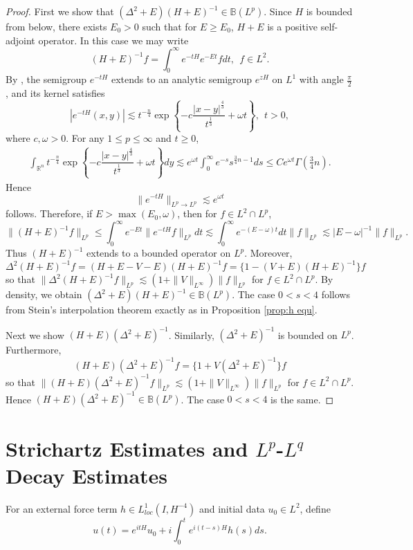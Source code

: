 \documentclass[11pt,a4paper]{article}
\numberwithin{equation}{section}
\begin{document}
\begin{proof}
First we show that $(\Delta^{2} + E)(H + E)^{-1} \in \mathbb{B}(L^{p})$. Since $H$ is bounded from below, there exists $E_{0} > 0$ such that for $E \geq E_{0}$, $H + E$ is a positive self-adjoint operator. In this case we may write
\[ (H + E)^{-1}f = \int_{0}^{\infty} e^{-tH}e^{-Et}fdt,\ \ f \in L^{2}. \]
By \cite{Deng-1}, the semigroup $e^{-tH}$ extends to an analytic semigroup $e^{zH}$ on $L^{1}$ with angle $\frac{\pi}{2}$, and its kernel satisfies
\begin{equation}
|e^{-tH}(x, y)| \lesssim t^{-\frac{n}{4}} \exp \left \{ -c\dfrac{|x - y|^{\frac{4}{3}}}{t^{\frac{1}{3}}} + \omega t \right\},\ \ t > 0,
\end{equation}
where $c, \omega > 0$. For any $1 \leq p \leq \infty$ and $t \geq 0$,
\begin{align*}
\int_{\mathbb{R}^{n}} t^{-\frac{n}{4}} \exp \left \{ -c\dfrac{|x - y|^{\frac{4}{3}}}{t^{\frac{1}{3}}} + \omega t \right\} dy \lesssim e^{\omega t}\int_{0}^{\infty} e^{-s}s^{\frac{3}{4}n - 1} ds \leq Ce^{\omega t}\Gamma\left(\frac{3}{4}n\right).
\end{align*}
Hence
\[ \|e^{-tH}\|_{L^{p} \rightarrow L^{p}} \lesssim e^{\omega t } \]
follows. Therefore, if $E > \max(E_{0}, \omega)$, then for $f \in L^{2} \cap L^{p}$,
\[ \|(H + E)^{-1}f\|_{L^{p}} \leq \int_{0}^{\infty}e^{-Et}\|e^{-tH}f\|_{L^{p}}dt \lesssim \int_{0}^{\infty}e^{-(E-\omega )t}dt \|f\|_{L^{p}} \lesssim |E - \omega|^{-1}\|f\|_{L^{p}}. \]
Thus $(H + E)^{-1}$ extends to a bounded operator on $L^{p}$. Moreover,
\[ \Delta^{2}(H + E)^{-1}f = (H + E -V -E)(H + E)^{-1}f = \{1 - (V + E)(H + E)^{-1}\}f \]
so that $\|\Delta^{2}(H + E)^{-1}f\|_{L^{p}} \lesssim (1 + \|V\|_{L^{\infty}})\|f\|_{L^{p}}$ for $f \in L^{2}\cap L^{p}$. By density, we obtain $(\Delta^{2} + E)(H + E)^{-1} \in \mathbb{B}(L^{p})$. The case $0 < s < 4$ follows from Stein's interpolation theorem exactly as in Proposition \ref{prop:h equ}.

Next we show $(H + E)(\Delta^{2}+E)^{-1}$. Similarly, $(\Delta^{2} + E)^{-1}$ is bounded on $L^{p}$. Furthermore,
\[ (H + E)(\Delta^{2} + E)^{-1}f = \{1 + V(\Delta^{2} + E)^{-1}\}f \]
so that $\|(H + E)(\Delta^{2} + E)^{-1}f\|_{L^{p}} \lesssim (1 + \|V\|_{L^{\infty}})\|f\|_{L^{p}}$ for $f \in L^{2}\cap L^{p}$. Hence $(H + E)(\Delta^{2} + E)^{-1} \in \mathbb{B}(L^{p})$. The case $0 < s < 4$ is the same.
\end{proof}

\section{Strichartz Estimates and $L^{p}$-$L^{q}$ Decay Estimates}
For an external force term $h\in L_{loc}^{1}(I, H^{-4})$ and initial data $u_{0} \in L^{2}$, define
\begin{equation}\label{eq:duhamel}
u(t) = e^{itH}u_{0} + i\int_{0}^{t} e^{i(t - s)H}h(s) ds.
\end{equation}
\end{document}
